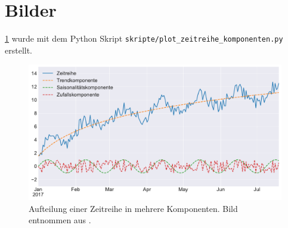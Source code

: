 \section{Bilder}

\ref{fig:zeitreihe-komponenten} wurde mit dem Python Skript \verb|skripte/plot_zeitreihe_komponenten.py| erstellt.

\begin{figure}[h]
  \centering
  \includegraphics[width=\textwidth]{bilder/02-hauptteil/zeitreihe-komponenten.pdf}
  \caption[Aufteilung einer Zeitreihe in mehrere Komponenten]{Aufteilung einer Zeitreihe in mehrere Komponenten. Bild entnommen aus \citet{Masterthesis.2017}.}
  \label{fig:zeitreihe-komponenten}
\end{figure}

